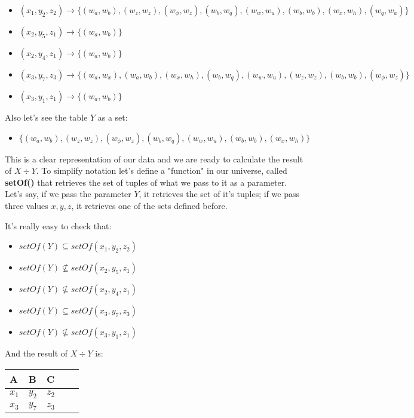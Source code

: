 \documentclass{article}
\begin{document}
\begin{itemize}
\item $(x_1,y_2,z_2) \rightarrow \{ (w_a,w_b), (w_z,w_z),(w_\phi,w_z),(w_b,w_q),(w_w,w_u),(w_b,w_b),(w_x,w_h),(w_q, w_a)\}$
\item $(x_2,y_5,z_1) \rightarrow \{ (w_a,w_b)\}$
\item $(x_2,y_4,z_1) \rightarrow \{ (w_a,w_b)\}$
\item $(x_3,y_7,z_3) \rightarrow \{ (w_a,w_x),(w_a,w_b), (w_x,w_h),(w_b,w_q),(w_w,w_u),(w_z,w_z),(w_b, w_b),(w_\phi, w_z)\}$
\item $(x_3,y_1,z_1) \rightarrow \{ (w_a,w_b)\}$
\end{itemize}

\vskip 0.2in

Also let's see the table $Y$ as a set:

\begin{itemize}
\item $\{ (w_a,w_b),(w_z,w_z), (w_\phi,w_z),(w_b,w_q),(w_w,w_u),(w_b,w_b),(w_x, w_h)\}$
\end{itemize}

\newpage

This is a clear representation of our data and we are ready to calculate the result of $X \div Y$. To simplify notation let's define a "function" in our universe, called \textbf{setOf()} that retrieves the set of tuples of what we pass to it as a parameter. Let's say, if we pass the parameter $Y$, it retrieves the set of it's tuples; if we pass three values $x,y,z$, it retrieves one of the sets defined before.

\vskip 0.2in
It's really easy to check that:

\begin{itemize}
  \item $setOf(Y) \subseteq setOf(x_1,y_2,z_2)$ 
  \item $setOf(Y) \not\subseteq setOf(x_2,y_5,z_1) $ 
  \item $setOf(Y) \not\subseteq setOf(x_2,y_4,z_1) $ 
  \item $setOf(Y) \subseteq setOf(x_3,y_7,z_3) $ 
  \item $setOf(Y) \not\subseteq setOf(x_3,y_1,z_1) $ 
\end{itemize}

\vskip 0.2in
And the result of $X \div Y$ is:

\vskip 0.2in
\begin{tabular}{lllll}
  \hline
  A & B & C\\
  \hline
  \multicolumn{1}{|c|}{$x_1$} & \multicolumn{1}{c|}{$y_2$} & \multicolumn{1}{c|}{$z_2$} \\ \hline
  \multicolumn{1}{|c|}{$x_3$} & \multicolumn{1}{c|}{$y_7$} & \multicolumn{1}{c|}{$z_3$} \\ \hline
\end{tabular}
\end{document}
